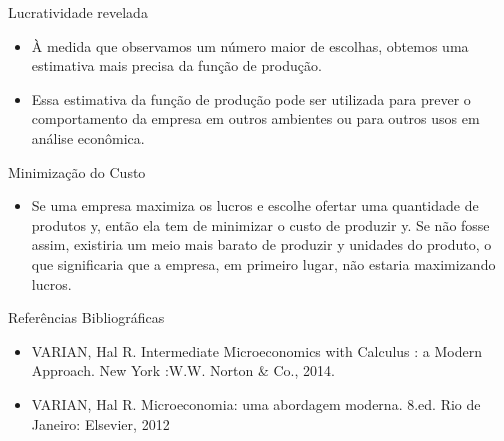 \documentclass[aspectratio=169]{beamer}
\begin{document}
\begin{frame}{Lucratividade revelada}

\begin{block}{ }

\begin{itemize}
    \item À medida que observamos um número maior de escolhas, obtemos uma estimativa mais precisa da função de produção.
    \item Essa estimativa da função de produção pode ser utilizada para prever o comportamento da empresa em outros ambientes ou para outros usos em análise econômica.
    
\end{itemize}

\end{block}
\end{frame}

\begin{frame}{Minimização do Custo}

\begin{block}{ }

\begin{itemize}
    \item Se uma empresa maximiza os lucros e escolhe ofertar uma quantidade de produtos y, então ela tem de minimizar o custo de produzir y. Se não fosse assim, existiria um meio mais barato de produzir y unidades do produto, o que significaria que a empresa, em primeiro lugar, não estaria maximizando lucros.
\end{itemize}

\end{block}
\end{frame}

\begin{frame}{Referências Bibliográficas}

\begin{block}{ }

\begin{itemize}
    \item VARIAN, Hal R. Intermediate Microeconomics with Calculus : a Modern Approach. New York :W.W. Norton & Co., 2014.
    \item VARIAN, Hal R. Microeconomia: uma abordagem moderna. 8.ed. Rio de Janeiro: Elsevier, 2012
\end{itemize}

\end{block}
\end{frame}
\end{document}
